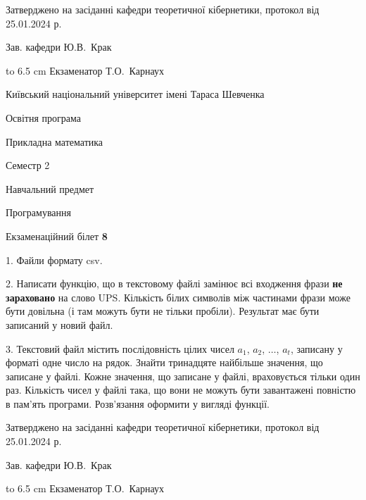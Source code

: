 \documentclass[12pt, ukrainian]{article}
\begin{document}
{\smallskip\smallskip \begin {scriptsize} Затверджено на засіданні кафедри теоретичної кібернетики, протокол   від   25.01.2024 р.\par\smallskip\smallskip\smallskip\smallskip
{\parbox {6.5 cm} {Зав. кафедри \dotfill Ю.В.~Крак}}\hspace {0.7cm} {\hbox to 6.5 cm { Екзаменатор \dotfill Т.О.~Карнаух}} \end{scriptsize}}
\vspace{0.9cm}
{{\begin {scriptsize}\par
{ \center  Київський національний університет імені Тараса Шевченка \par}
{\parbox {5 cm}{Освітня програма \hfill}{\parbox {7 cm}{Прикладна математика\hfill}}\parbox {6 cm}{\hfill Семестр 2}}\par
{\parbox {5 cm} {Навчальний предмет \hfill}\parbox {7 cm}{Програмування \hfill}\parbox {6cm}{\hfill}\par}\vspace{-15pt} \end{scriptsize}}{\center Екзаменаційний білет \No \textbf { 8 }\par}}
{%
1. Файли формату csv.%
\par
2. Написати функцію, що в текстовому файлі замінює всі входження фрази \textbf{не зараховано} на слово UPS. Кількість білих символів між частинами фрази може бути довільна (і там можуть бути не тільки пробіли). Результат має бути записаний у новий файл.

\par
3. Текстовий файл містить послідовність цілих чисел $a_1$, $a_2$, $\ldots$, $a_t$, записану у форматі одне число на рядок. Знайти тринадцяте найбільше значення, що записане у файлі. Кожне значення, що записане у файлі, враховується тільки один раз. Кількість чисел у файлі така, що вони не можуть бути завантажені повністю в пам'ять програми. Розв'язання оформити у вигляді функції.

}
{\smallskip\smallskip \begin {scriptsize} Затверджено на засіданні кафедри теоретичної кібернетики, протокол   від   25.01.2024 р.\par\smallskip\smallskip\smallskip\smallskip
{\parbox {6.5 cm} {Зав. кафедри \dotfill Ю.В.~Крак}}\hspace {0.7cm} {\hbox to 6.5 cm { Екзаменатор \dotfill Т.О.~Карнаух}} \end{scriptsize}}
\vspace{0.9cm}
\end{document}
